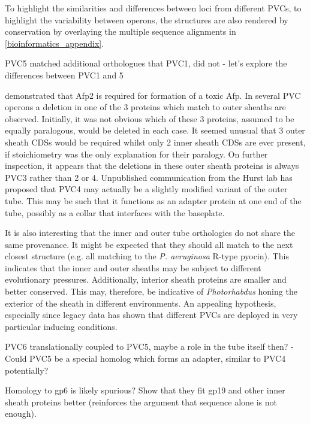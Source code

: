 To highlight the similarities and differences between loci from different PVCs, to highlight the variability between operons, the structures are also rendered by conservation by overlaying the multiple sequence alignments in \ref{bioinformatics_appendix}. 

PVC5 matched additional orthologues that PVC1, did not - let's explore the differences between PVC1 and 5

\cite{Hurst2004} demonstrated that Afp2 is required for formation of a toxic Afp. In several PVC operons a deletion in one of the 3 proteins which match to outer sheaths are observed. Initially, it was not obvious which of these 3 proteins, assumed to be equally paralogous, would be deleted in each case. It seemed unusual that 3 outer sheath CDSs would be required whilst only 2 inner sheath CDSs are ever present, if stoichiometry was the only explanation for their paralogy. On further inspection, it appears that the deletions in these outer sheath proteins is always PVC3 rather than 2 or 4. Unpublished communication from the Hurst lab has proposed that PVC4 may actually be a slightly modified variant of the outer tube. This may be such that it functions as an adapter protein at one end of the tube, possibly as a collar that interfaces with the baseplate.


It is also interesting that the inner and outer tube orthologies do not share the same provenance. It might be expected that they should all match to the next closest structure (e.g. all matching to the \emph{P. aeruginosa} R-type pyocin). This indicates that the inner and outer sheaths may be subject to different evolutionary pressures. Additionally, interior sheath proteins are smaller and better conserved. This may, therefore, be indicative of \emph{Photorhabdus} honing the exterior of the sheath in different environments. An appealing hypothesis, especially since legacy data has shown that different PVCs are deployed in very particular inducing conditions.






PVC6 translationally coupled to PVC5, maybe a role in the tube itself then?
	- Could PVC5 be a special homolog which forms an adapter, similar to PVC4 potentially?

Homology to gp6 is likely spurious? Show that they fit gp19 and other inner sheath proteins better (reinforces the argument that sequence alone is not enough).






